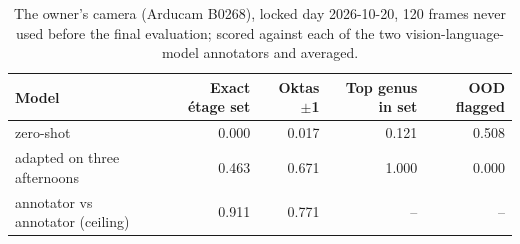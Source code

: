 \begin{table}[t]
\centering
\footnotesize
\begin{tabular}{lrrrr}
\toprule
Model & Exact étage set & Oktas $\pm$1 & Top genus in set & OOD flagged \\
\midrule
zero-shot & 0.000 & 0.017 & 0.121 & 0.508 \\
adapted on three afternoons & 0.463 & 0.671 & 1.000 & 0.000 \\
annotator vs annotator (ceiling) & 0.911 & 0.771 & – & – \\
\bottomrule
\end{tabular}
\caption{The owner's camera (Arducam B0268), locked day 2026-10-20, 120 frames never used before the final evaluation; scored against each of the two vision-language-model annotators and averaged.}
\label{tab:b0268}
\end{table}
